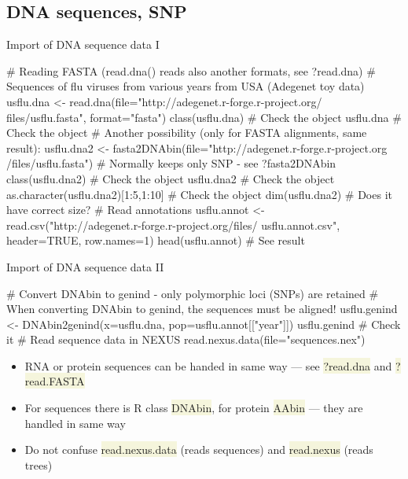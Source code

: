 \documentclass[compress, ucs, xelatex, 11pt, xcolor=svgnames, aspectratio=169,
	hyperref={
		bookmarks=true,
		unicode=true,
		colorlinks=true,
		pdftitle={Molecular data in R},
		plainpages=false,
		pdfauthor={Vojtech Zeisek},
		pdfsubject={Course about phylogeny and evolution in R},
		pdfcreator={XeLaTeX},
		pdfkeywords={R, evolution, phylogeny, molecular data},
		linkcolor=Crimson, %
		anchorcolor=Magenta, %
		citecolor=Magenta, %
		filecolor=Magenta, %
		menucolor=Magenta, %
		urlcolor=DodgerBlue, %
		pdftex},
	url={hyphens, lowtilde} %
	]{beamer}
\renewcommand{\texttt}[1]{\colorbox{Beige}{{\ttfamily #1}}}
\begin{document}
\subsection{DNA sequences, SNP}

\begin{frame}[fragile]{Import of DNA sequence data I}
	\begin{spluscode}
    # Reading FASTA (read.dna() reads also another formats, see ?read.dna)
    # Sequences of flu viruses from various years from USA (Adegenet toy data)
    usflu.dna <- read.dna(file="http://adegenet.r-forge.r-project.org/
      files/usflu.fasta", format="fasta")
    class(usflu.dna) # Check the object
    usflu.dna # Check the object
    # Another possibility (only for FASTA alignments, same result):
    usflu.dna2 <- fasta2DNAbin(file="http://adegenet.r-forge.r-project.org
      /files/usflu.fasta") # Normally keeps only SNP - see ?fasta2DNAbin
    class(usflu.dna2) # Check the object
    usflu.dna2 # Check the object
    as.character(usflu.dna2)[1:5,1:10] # Check the object
    dim(usflu.dna2) # Does it have correct size?
    # Read annotations
    usflu.annot <- read.csv("http://adegenet.r-forge.r-project.org/files/
      usflu.annot.csv", header=TRUE, row.names=1)
    head(usflu.annot) # See result
	\end{spluscode}
\end{frame}

\begin{frame}[fragile]{Import of DNA sequence data II}
	\begin{spluscode}
    # Convert DNAbin to genind - only polymorphic loci (SNPs) are retained
    # When converting DNAbin to genind, the sequences must be aligned!
    usflu.genind <- DNAbin2genind(x=usflu.dna, pop=usflu.annot[["year"]])
    usflu.genind # Check it
    # Read sequence data in NEXUS
    read.nexus.data(file="sequences.nex")
	\end{spluscode}
	\begin{itemize}
		\item RNA or protein sequences can be handed in same way --- see \texttt{?read.dna} and \texttt{?read.FASTA}
		\item For sequences there is R class \texttt{DNAbin}, for protein \texttt{AAbin} --- they are handled in same way
		\item Do not confuse \texttt{read.nexus.data} (reads sequences) and \texttt{read.nexus} (reads trees)
	\end{itemize}
\end{frame}
\end{document}
